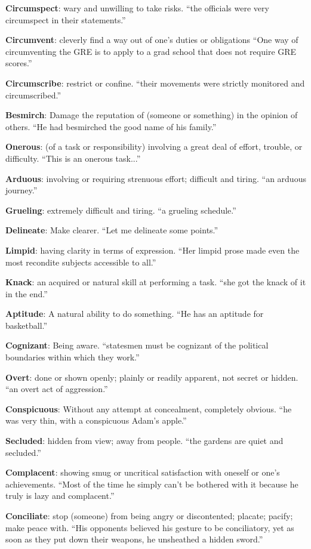 \documentclass[12pt, a4paper]{ximera}
\begin{document}
\textbf{Circumspect}: wary and unwilling to take risks. ``the officials were very circumspect in their statements.''

\textbf{Circumvent}: cleverly find a way out of one's duties or obligations ``One way of circumventing the GRE is to apply to a grad school that does not require GRE scores.''

\textbf{Circumscribe}: restrict or confine. ``their movements were strictly monitored and circumscribed.''

\textbf{Besmirch}: Damage the reputation of (someone or something) in the opinion of others. ``He had besmirched the good name of his family.''

\textbf{Onerous}: (of a task or responsibility) involving a great deal of effort, trouble, or difficulty. ``This is an onerous task...''
 
\textbf{Arduous}: involving or requiring strenuous effort; difficult and tiring. ``an arduous journey.''
 
\textbf{Grueling}: extremely difficult and tiring. ``a grueling schedule.''
 
\textbf{Delineate}: Make clearer. ``Let me delineate some points.''

\textbf{Limpid}: having clarity in terms of expression. ``Her limpid prose made even the most recondite subjects accessible to all.''

\textbf{Knack}: an acquired or natural skill at performing a task. ``she got the knack of it in the end.''

\textbf{Aptitude}: A natural ability to do something. ``He has an aptitude for basketball.''

\textbf{Cognizant}: Being aware. ``statesmen must be cognizant of the political boundaries within which they work.''

\textbf{Overt}: done or shown openly; plainly or readily apparent, not secret or hidden. ``an overt act of aggression.''

\textbf{Conspicuous}: Without any attempt at concealment, completely obvious. ``he was very thin, with a conspicuous Adam's apple.''

\textbf{Secluded}: hidden from view; away from people. ``the gardens are quiet and secluded.''

\textbf{Complacent}: showing smug or uncritical satisfaction with oneself or one's achievements. ``Most of the time he simply can't be bothered with it because he truly is lazy and complacent.''

\textbf{Conciliate}: stop (someone) from being angry or discontented; placate; pacify; make peace with. ``His opponents believed his gesture to be conciliatory, yet as soon as they put down their weapons, he unsheathed a hidden sword.''
\end{document}
